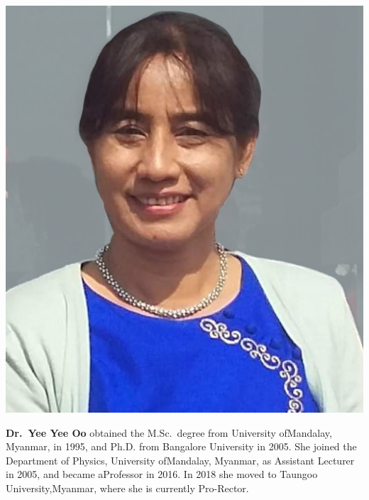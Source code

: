 \centerline{\includegraphics[scale=.8]{authorsphotos/YeeYeeOo1.jpg}}
\medskip

\noindent
\textbf{Dr.\ Yee Yee Oo} obtained the M.Sc.\ degree from University of\break Mandalay, Myanmar, in 1995, and Ph.D. from Bangalore University in 2005. She joined the Department of Physics, University of\break Mandalay, Myanmar, as Assistant Lecturer in 2005, and became a\break Professor in 2016. In 2018 she moved to Taungoo University,\break Myanmar, where she is currently Pro-Rector.
